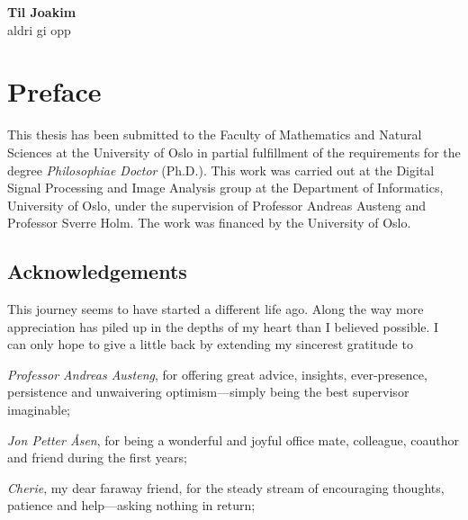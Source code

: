
\endofdump


\cleardoublepage

\vspace*{\fill}
\begin{center}
{\huge\bf Til Joakim} \\[1.5cm]
{\Large aldri gi opp}
\end{center}
\vspace*{\fill}

\clearpage

\ifRootBuild\else
  
  \makeglossaries
\fi


\pagestyle{normal}



\chapter*{Preface}

This thesis has been submitted to the Faculty of Mathematics and Natural Sciences at the University of Oslo in partial fulfillment of the requirements for the degree \emph{Philosophiae Doctor} (Ph.D.). This work was carried out at the Digital Signal Processing and Image Analysis group at the Department of Informatics, University of Oslo, under the supervision of Professor Andreas Austeng and Professor Sverre Holm. The work was financed by the University of Oslo.

\section*{Acknowledgements}

This journey seems to have started a different life ago. Along the way more appreciation has piled up in the depths of my heart than I believed possible. I can only hope to give a little back by extending my sincerest gratitude to 


\emph{Professor Andreas Austeng}, for offering great advice, insights, ever-presence, persistence and unwaivering optimism---simply being the best supervisor imaginable;

\emph{Jon Petter Åsen}, for being a wonderful and joyful office mate, colleague, coauthor and friend during the first years;

\emph{Cherie}, my dear faraway friend, for the steady stream of encouraging thoughts, patience and help---asking nothing in return;

